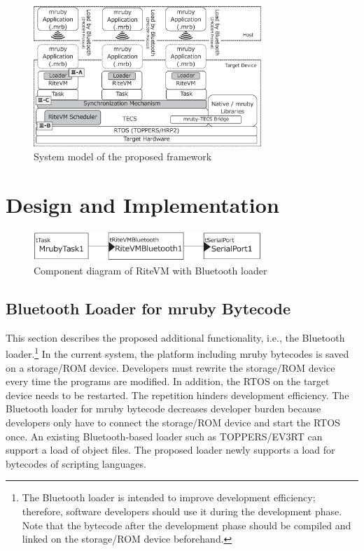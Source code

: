 \documentclass[conference]{IEEEtran/IEEEtran/IEEEtran}
\begin{document}
\begin{figure}[t]
    \centering
    \includegraphics[width=8.6cm,clip]{figure/system_model.eps}
    \vspace{-3mm}
\caption{System model of the proposed framework}
    \vspace{-3mm}
\label{fig:system_model}
\end{figure}

\section{Design and Implementation}
\label{sec:Design and Implementation}

\begin{figure}[t]
    \centering
    \includegraphics[width=8.6cm,clip]{figure/component_bluetooth.eps}
    \vspace{-3mm}
\caption{Component diagram of RiteVM with Bluetooth loader}
    \vspace{-3mm}
\label{fig:component_bluetooth}
\end{figure}

\subsection{Bluetooth Loader for mruby Bytecode}
\label{sec:Bluetooth loader for mruby bytecode}
This section describes the proposed additional functionality, i.e., the Bluetooth loader.\footnote{
The Bluetooth loader is intended to improve development efficiency; therefore, software developers should use it during the development phase.
Note that the bytecode after the development phase should be compiled and linked on the storage/ROM device beforehand.
}
In the current system, the platform including mruby bytecodes is saved on a storage/ROM device.
Developers must rewrite the storage/ROM device every time the programs are modified.
In addition, the RTOS on the target device needs to be restarted.
The repetition hinders development efficiency.
The Bluetooth loader for mruby bytecode decreases developer burden because developers only have to connect the storage/ROM device and start the RTOS once. 
An existing Bluetooth-based loader such as TOPPERS/EV3RT \cite{par:EV3} can support a load of object files.
The proposed loader newly supports a load for bytecodes of scripting languages.
\end{document}
